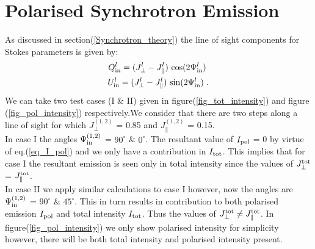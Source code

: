 \documentclass[usenatbib]{mnras}
\begin{document}
\section{Polarised Synchrotron Emission}
\label{Appendix_A}
As discussed in section(\ref{Synchrotron_theory}) the line of sight components for Stokes parameters is given by:
\begin{eqnarray}
Q^l_{\rm in} = ({J_{\perp}^l} - J_{\parallel}^l) \ {\cos}(2\Psi^l_{\rm in}) \ \\ U^l_{\rm in} = ({J_{\perp}^l} - J_{\parallel}^l) \ {\sin}(2\Psi^l_{\rm in}) \ .
\end{eqnarray}
We can take two test cases (I \& II) given in figure(\ref{fig_tot_intensity}) and figure (\ref{fig_pol_intensity}) respectively.We consider that there are two steps along a line of sight for which ${J_{\perp}^{(1,2)}}$ = 0.85 and $J_{\parallel}^{(1,2)}$  = 0.15. 
\\ In case I the angles $\Psi_{\rm in}^{(1,2)}$ = $90^{\circ}$ \& $0^{\circ}$. The resultant value of $I_{\rm pol}$ = 0 by virtue of eq.(\ref{eq_I_pol}) and we only have a contribution in $I_{\rm tot}$. This implies that for case I the resultant emission is seen only in total intensity since the values of $J_{\perp}^{\rm tot}$ = $J_{\parallel}^{\rm tot}$. 
\\ In case II we apply similar calculations to case I however, now the angles are $\Psi_{\rm in}^{(1,2)}$ = $90^{\circ}$ \& $45^{\circ}$. This in turn results in contribution to both polarised emission $I_{\rm pol}$ and total intensity $I_{\rm tot}$. Thus the values of $J_{\perp}^{\rm tot} \neq J_{\parallel}^{\rm tot}$. In figure(\ref{fig_pol_intensity}) we only show polarised intensity for simplicity however, there will be both total intensity and polarised intensity present.
\end{document}

